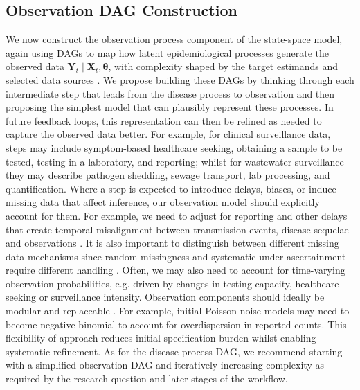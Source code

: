 \documentclass{article}
\begin{document}
\subsection{Observation DAG Construction} \label{sec:observation}

We now construct the observation process component of the state-space model, again using \ac{DAG}s to map how latent epidemiological processes generate the observed data $\boldsymbol{Y}_t \mid \boldsymbol{X}_t, \boldsymbol{\theta}$, with complexity shaped by the target estimands and selected data sources \citep{deangelis2018analysing,birrell2018evidence}.
We propose building these \ac{DAG}s by thinking through each intermediate step that leads from the disease process to observation and then proposing the simplest model that can plausibly represent these processes.
In future feedback loops, this representation can then be refined as needed to capture the observed data better.
For example, for clinical surveillance data, steps may include symptom-based healthcare seeking, obtaining a sample to be tested, testing in a laboratory, and reporting; whilst for wastewater surveillance they may describe pathogen shedding, sewage transport, lab processing, and quantification.
Where a step is expected to introduce delays, biases, or induce missing data that affect inference, our observation model should explicitly account for them. For example, we need to adjust for reporting and other delays that create temporal misalignment between transmission events, disease sequelae and observations  \citep{seaman2022nowcasting}. It is also important to distinguish between different missing data mechanisms since random missingness and systematic under-ascertainment require different handling \citep{sherratt2021exploring}. Often, we may  also need to account for time-varying observation probabilities, e.g. driven by changes in testing capacity, healthcare seeking or surveillance intensity. Observation components should ideally be modular and replaceable  \citep{gelman2020bayesian}. For example, initial Poisson noise models may need to become negative binomial to account for overdispersion in reported counts. This flexibility of approach reduces initial specification burden whilst enabling systematic refinement.
As for the disease process \ac{DAG}, we recommend starting with a simplified observation DAG and iteratively increasing complexity as required by the research question and later stages of the workflow.
\end{document}
